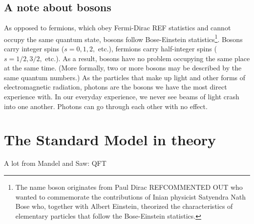 \subsection*{A note about bosons}
As opposed to fermions, which obey Fermi-Dirac REF statistics and cannot occupy the same quantum state, bosons follow Bose-Einstein statistics\footnote{The name boson originates from Paul Dirac REFCOMMENTED OUT
who wanted to commemorate the contributions of Inian physicist Satyendra Nath Bose who, together with Albert Einstein, theorized the characteristics of elementary particles that follow the Bose-Einstein statistics.}. Bosons carry integer spins ($s=0,1,2,$ etc.), fermions carry half-integer spins ($s=1/2,3/2,$ etc.). As a result, bosons have no problem occupying the same place at the same time. (More formally, two or more bosons may be described by the same quantum numbers.) As the particles that make up light and other forms of electromagnetic radiation, photons are the bosons we have the most direct experience with. In our everyday experience, we never see beams of light crash into one another. Photons can go through each other with no effect.

\section{The Standard Model in theory}
A lot from Mandel and Saw: QFT

